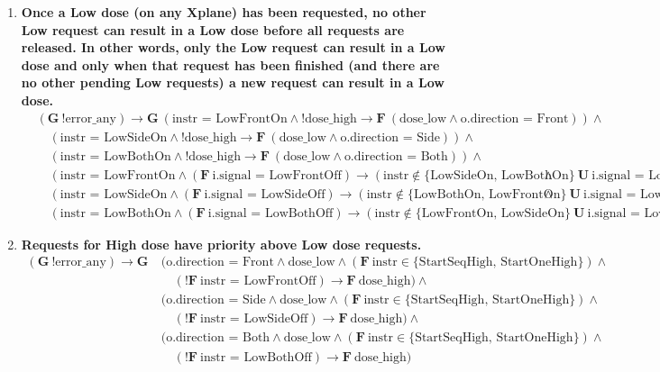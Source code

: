 \documentclass[a4paper,10pt]{article}
\newcommand{\LTLG}{\mathbf{G~}}
\newcommand{\LTLF}{\mathbf{F~}}
\newcommand{\LTLU}{\mathbf{~U~}}
\newcommand{\imply}{\rightarrow}
\newcommand{\doselow}{\textrm{dose\_low}}
\newcommand{\dosehigh}{\textrm{dose\_high}}
\newcommand{\errorany}{\textrm{error\_any}}
\begin{document}
\begin{enumerate}
		\item \textbf{Once a Low dose (on any Xplane) has been requested, no other Low request can result in a Low dose before all requests are released. In other words, only the Low request can result in a Low dose and only when that request has been finished (and there are no other pending Low requests) a new request can result in a Low dose.}
			\begin{align*}
				&(\LTLG !\errorany) \imply \LTLG (\textrm{instr = LowFrontOn} \land !\dosehigh \imply \LTLF (\doselow \land \textrm{o.direction = Front})) \land \\
				&	\hspace{1em}(\textrm{instr = LowSideOn} \land !\dosehigh \imply \LTLF (\doselow \land \textrm{o.direction = Side})) \land \\
				&	\hspace{1em}(\textrm{instr = LowBothOn} \land !\dosehigh \imply \LTLF (\doselow \land \textrm{o.direction = Both})) \land \\
				&	\hspace{1em}(\textrm{instr = LowFrontOn} \land (\LTLF \textrm{i.signal = LowFrontOff}) \imply (\textrm{instr} \notin \{\textrm{LowSideOn, LowBothOn}\} \LTLU \textrm{i.signal = LowFrontOff})) \land \\
				&	\hspace{1em}(\textrm{instr = LowSideOn} \land (\LTLF \textrm{i.signal = LowSideOff}) \imply (\textrm{instr} \notin \{\textrm{LowBothOn, LowFrontOn}\} \LTLU \textrm{i.signal = LowSideOff})) \land \\
				&	\hspace{1em}(\textrm{instr = LowBothOn} \land (\LTLF \textrm{i.signal = LowBothOff}) \imply (\textrm{instr} \notin \{\textrm{LowFrontOn, LowSideOn}\} \LTLU \textrm{i.signal = LowBothOff}))
			\end{align*}

		\item \textbf{Requests for High dose have priority above Low dose requests.}
			\begin{align*}
				(\LTLG !\errorany) \imply \LTLG &(\textrm{o.direction = Front} \land \doselow \land (\LTLF \textrm{instr} \in \{\textrm{StartSeqHigh, StartOneHigh}\}) \land \\
					&	\hspace{1em}(!\LTLF \textrm{instr = LowFrontOff}) \imply \LTLF \dosehigh) \land \\
					&(\textrm{o.direction = Side} \land \doselow \land (\LTLF \textrm{instr} \in \{\textrm{StartSeqHigh, StartOneHigh}\}) \land \\
					&	\hspace{1em}(!\LTLF \textrm{instr = LowSideOff}) \imply \LTLF \dosehigh) \land \\
					&(\textrm{o.direction = Both} \land \doselow \land (\LTLF \textrm{instr} \in \{\textrm{StartSeqHigh, StartOneHigh}\}) \land \\
					&	\hspace{1em}(!\LTLF \textrm{instr = LowBothOff}) \imply \LTLF \dosehigh)
			\end{align*}


\end{enumerate}
\end{document}

